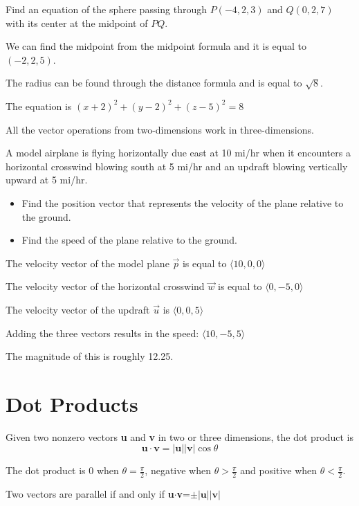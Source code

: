 \documentclass[../calc3.tex]{subfiles}
\begin{document}
\begin{example}
Find an equation of the sphere passing through $P(-4,2,3)$ and $Q(0,2,7)$ with its center at the midpoint of $PQ$.

We can find the midpoint from the midpoint formula and it is equal to $(-2,2,5)$. 

The radius can be found through the distance formula and is equal to $\sqrt{8}$.

The equation is $(x+2)^2+(y-2)^2+(z-5)^2=8$
\end{example}

All the vector operations from two-dimensions work in three-dimensions. 
\begin{example}
A model airplane is flying horizontally due east at 10 mi/hr when it encounters a horizontal 
crosswind blowing south at 5 mi/hr and an updraft blowing vertically upward at 5 mi/hr. 
\begin{itemize}
    \item Find the position vector that represents the velocity of the plane relative to the ground.
    \item Find the speed of the plane relative to the ground.
\end{itemize}
The velocity vector of the model plane $\vec{p}$ is equal to $\langle 10,0,0 \rangle$

The velocity vector of the horizontal crosswind $\vec{w}$ is equal to $\langle 0,-5,0\rangle$

The velocity vector of the updraft $\vec{u}$ is $\langle 0,0,5\rangle$

Adding the three vectors results in the speed: $\langle 10,-5,5\rangle$

The magnitude of this is roughly 12.25.
\end{example}

\section{Dot Products}
\begin{definition}
    Given two nonzero vectors \textbf{u} and \textbf{v} in two or three dimensions, the dot product is
    \[\textbf{u}\cdot\textbf{v}=|\textbf{u}||\textbf{v}|\cos \theta\]
\end{definition}

The dot product is 0 when $\theta=\frac{\pi}{2}$, negative when $\theta>\frac{\pi}{2}$ and positive when $\theta<\frac{\pi}{2}$.

Two vectors are parallel if and only if \textbf{u}$\cdot$\textbf{v}=$\pm|\textbf{u}||\textbf{v}|$ 
\end{document}
